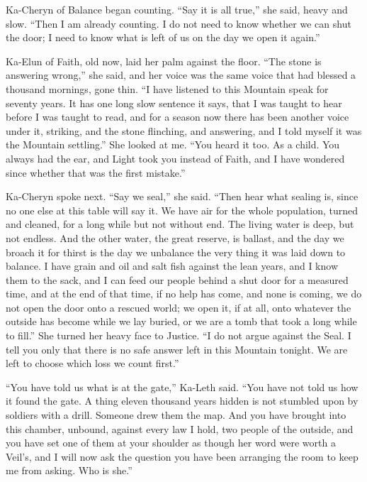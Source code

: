 Ka-Cheryn of Balance began counting. ``Say it is all true,'' she said, heavy and slow. ``Then I am already counting. I do not need to know whether we can shut the door; I need to know what is left of us on the day we open it again.''\par

Ka-Elun of Faith, old now, laid her palm against the floor. ``The stone is answering wrong,'' she said, and her voice was the same voice that had blessed a thousand mornings, gone thin. ``I have listened to this Mountain speak for seventy years. It has one long slow sentence it says, that I was taught to hear before I was taught to read, and for a season now there has been another voice under it, striking, and the stone flinching, and answering, and I told myself it was the Mountain settling.'' She looked at me. ``You heard it too. As a child. You always had the ear, and Light took you instead of Faith, and I have wondered since whether that was the first mistake.''\par

Ka-Cheryn spoke next. ``Say we seal,'' she said. ``Then hear what sealing is, since no one else at this table will say it. We have air for the whole population, turned and cleaned, for a long while but not without end. The living water is deep, but not endless. And the other water, the great reserve, is ballast, and the day we broach it for thirst is the day we unbalance the very thing it was laid down to balance. I have grain and oil and salt fish against the lean years, and I know them to the sack, and I can feed our people behind a shut door for a measured time, and at the end of that time, if no help has come, and none is coming, we do not open the door onto a rescued world; we open it, if at all, onto whatever the outside has become while we lay buried, or we are a tomb that took a long while to fill.'' She turned her heavy face to Justice. ``I do not argue against the Seal. I tell you only that there is no safe answer left in this Mountain tonight. We are left to choose which loss we count first.''\par

\ornament


``You have told us what is at the gate,'' Ka-Leth said. ``You have not told us how it found the gate. A thing eleven thousand years hidden is not stumbled upon by soldiers with a drill. Someone drew them the map. And you have brought into this chamber, unbound, against every law I hold, two people of the outside, and you have set one of them at your shoulder as though her word were worth a Veil's, and I will now ask the question you have been arranging the room to keep me from asking. Who is she.''\par


